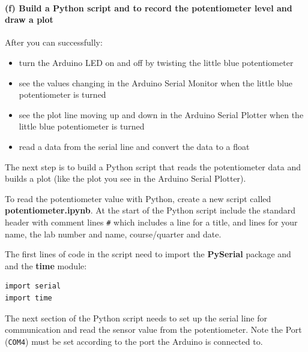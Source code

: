     \hypertarget{f-build-a-python-script-and-to-record-the-potentiometer-level-and-draw-a-plot}{%
\paragraph{(f) Build a Python script and to record the potentiometer
level and draw a
plot}\label{f-build-a-python-script-and-to-record-the-potentiometer-level-and-draw-a-plot}}

After you can successfully:

\begin{itemize}
\tightlist
\item
  turn the Arduino LED on and off by twisting the little blue
  potentiometer
\item
  see the values changing in the Arduino Serial Monitor when the little
  blue potentiometer is turned
\item
  see the plot line moving up and down in the Arduino Serial Plotter when the
  little blue potentiometer is turned
\item
  read a data from the serial line and convert the data to a float
\end{itemize}

The next step is to build a Python script that reads the
potentiometer data and builds a plot (like the plot you see in the
Arduino Serial Plotter).

To read the potentiometer value with Python, create a new script called
\textbf{potentiometer.ipynb}. At the start of the Python script include
the standard header with comment lines \texttt{\#} which includes a line
for a title, and lines for your name, the lab number and name,
course/quarter and date.

The first lines of code in the script need to import the
\textbf{PySerial} package and and the \textbf{time} module:

\begin{verbatim}
import serial
import time
\end{verbatim}

The next section of the Python script needs to set up the serial line
for communication and read the sensor value from the potentiometer. Note
the Port (\texttt{\textquotesingle{}COM4\textquotesingle{}}) must be set
according to the port the Arduino is connected to.


